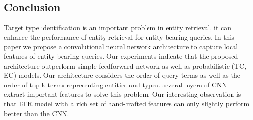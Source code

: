 \subsection{Conclusion}
Target type identification is an important problem in entity retrieval, it can enhance the performance of entity retrieval for entity-bearing queries. In this paper we propose a convolutional neural network architecture to capture local features of entity bearing queries. Our experiments indicate that the proposed architecture outperform simple feedforward network as well as probabilistic (TC, EC) models. Our architecture considers the order of query terms as well as the order of top-k terms representing entities and types. several layers of CNN extract important features to solve this problem. Our interesting observation is that LTR model with a rich set of hand-crafted features can only slightly perform better than the CNN.

